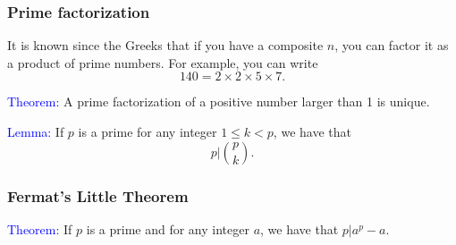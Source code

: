 \begin{frame}\frametitle{Prime factorization}
  It is known since the Greeks that if you have a composite $n$, you
  can factor it as a product of prime numbers.  For example, you can
  write
  \[ 140 = 2\times 2\times 5\times 7. \]
\end{frame}

\begin{frame}
  \textcolor{blue}{Theorem:} A prime factorization of a positive
  number larger than 1 is unique.
\end{frame}

\begin{frame}
  \textcolor{blue}{Lemma:} If $p$ is a prime for any integer $1\leq
  k<p$, we have that
  \[
  p\Big|\binom{p}{k}.
  \]
\end{frame}

\begin{frame}\frametitle{Fermat's Little Theorem}
  \begin{tcolorbox}
    \textcolor{blue}{Theorem:} If $p$ is a prime and for any integer
    $a$, we have that $p|a^p-a$.
  \end{tcolorbox}
\end{frame}
